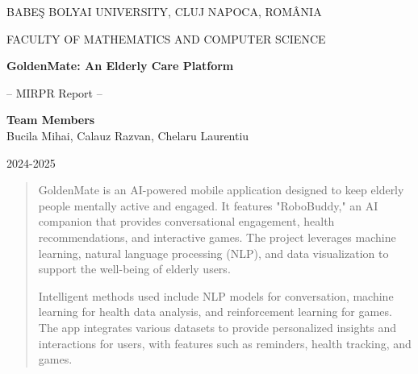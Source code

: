 \documentclass[runningheads,a4paper,11pt]{report}
\begin{document}
\begin{titlepage}
\sloppy

\begin{center}
BABE\c S BOLYAI UNIVERSITY, CLUJ NAPOCA, ROM\^ ANIA

FACULTY OF MATHEMATICS AND COMPUTER SCIENCE

\vspace{6cm}

\Huge \textbf{GoldenMate: An Elderly Care Platform}

\vspace{1cm}

\normalsize -- MIRPR Report --

\end{center}

\vspace{5cm}

\begin{flushright}
\Large{\textbf{Team Members}}\\
Bucila Mihai, Calauz Razvan, Chelaru Laurentiu
\end{flushright}

\vspace{4cm}

\begin{center}
2024-2025
\end{center}

\end{titlepage}


\begin{abstract}
	GoldenMate is an AI-powered mobile application designed to keep elderly people mentally active and engaged. It features "RoboBuddy," an AI companion that provides conversational engagement, health recommendations, and interactive games. The project leverages machine learning, natural language processing (NLP), and data visualization to support the well-being of elderly users.

	Intelligent methods used include NLP models for conversation, machine learning for health data analysis, and reinforcement learning for games. The app integrates various datasets to provide personalized insights and interactions for users, with features such as reminders, health tracking, and games.
\end{abstract}

\tableofcontents

\newpage

\listoftables
\listoffigures
\listofalgorithms
\end{document}
